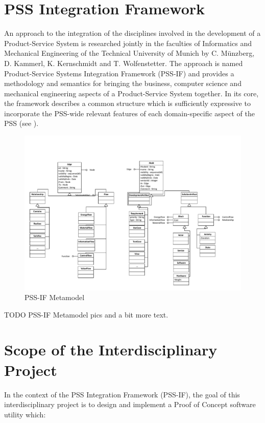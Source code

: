 \section*{PSS Integration Framework}

An approach to the integration of the disciplines involved in the development of a Product-Service System is researched jointly in the faculties of Informatics and Mechanical Engineering of the Technical University of Munich by C. M\"unzberg, D. Kammerl, K. Kernschmidt and T. Wolfenstetter. The approach is named Product-Service Systems Integration Framework (PSS-IF) and provides a methodology and semantics for bringing the business, computer science and mechanical engineering aspects of a Product-Service System together. In its core, the framework describes a common structure which is sufficiently expressive to incorporate the PSS-wide relevant features of each domain-specific aspect of the PSS (see ).

\begin{figure}
\centering
\includegraphics[width=\textwidth]{figures/PSSIF.pdf}
\caption{PSS-IF Metamodel}
\label{fig:canonic}
\end{figure}

\color{red}TODO PSS-IF Metamodel pics and a bit more text.\color{black}

\section*{Scope of the Interdisciplinary Project}

In the context of the PSS Integration Framework (PSS-IF), the goal of this interdisciplinary project is to design and implement a Proof of Concept software utility which:

